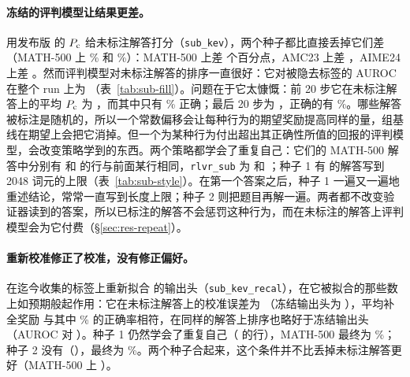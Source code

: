 \paragraph{冻结的评判模型让结果更差。} 用发布版 \kev{} 的 $P_{\mathrm{c}}$ 给未标注解答打分（\texttt{sub\_kev}），两个种子都比直接丢掉它们差（MATH-500 上 \% 和 \%）：MATH-500 上差   个百分点，AMC23 上差  ，AIME24 上差  。然而评判模型对未标注解答的排序一直很好：它对被隐去标签的 AUROC 在整个 run 上为 （表~\ref{tab:sub-fill}）。问题在于它太慷慨：前 20 步它在未标注解答上的平均 $P_{\mathrm{c}}$ 为 ，而其中只有 \% 正确；最后 20 步为 ，正确的有 \%。哪些解答被标注是随机的，所以一个常数偏移会让每种行为的期望奖励提高同样的量，组基线在期望上会把它消掉。但一个为某种行为付出超出其正确性所值的回报的评判模型，会改变策略学到的东西。两个策略都学会了重复自己：它们的 MATH-500 解答中分别有  和  的行与前面某行相同，\texttt{rlvr\_sub} 为  和 ；种子 1 有  的解答写到 2048 词元的上限（表~\ref{tab:sub-style}）。在第一个答案之后，种子 1 一遍又一遍地重述结论，常常一直写到长度上限；种子 2 则把题目再解一遍。两者都不改变验证器读到的答案，所以已标注的解答不会惩罚这种行为，而在未标注的解答上评判模型会为它付费（\S\ref{sec:res-repeat}）。

\begin{table}[t]
\centering\small

\caption{补全奖励在未标注解答上对照验证器被隐去的标签（逐步计算，再对步数和种子取平均）：前 20 步与 run 前后两半的 AUROC、冻结 \kev{} 在同样解答上的 AUROC、期望校准误差，以及平均补全奖励与其中正确解答所占比例的对照。}
\label{tab:sub-fill}
\end{table}

\paragraph{重新校准修正了校准，没有修正偏好。} 在迄今收集的标签上重新拟合 \kev{} 的输出头（\texttt{sub\_kev\_recal}），在它被拟合的那些数上如预期般起作用：它在未标注解答上的校准误差为 （冻结输出头为 ），平均补全奖励  与其中 \% 的正确率相符，在同样的解答上排序也略好于冻结输出头（AUROC  对 ）。种子 1 仍然学会了重复自己（ 的行），MATH-500 最终为 \%；种子 2 没有（），最终为 \%。两个种子合起来，这个条件并不比丢掉未标注解答更好（MATH-500 上  ）。


